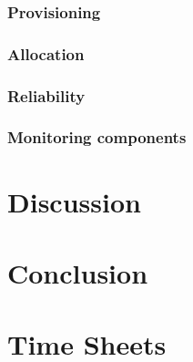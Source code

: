 \documentclass[a4paper]{IEEEtran}
\begin{document}
\subsubsection{Provisioning}

\subsubsection{Allocation}

\subsubsection{Reliability}

\subsubsection{Monitoring components}


\section{Discussion}

\section{Conclusion}





\appendix
\section{Time Sheets}
\end{document}
